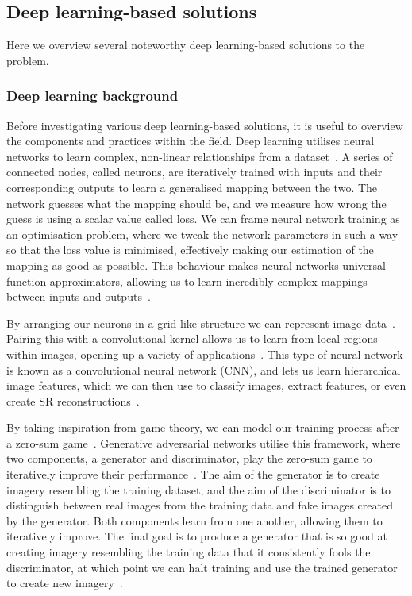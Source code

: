 \subsection{Deep learning-based solutions}
Here we overview several noteworthy deep learning-based solutions to the problem.

\subsubsection{Deep learning background}
Before investigating various deep learning-based solutions, it is useful to overview the components and practices within the field. Deep learning utilises neural networks to learn complex, non-linear relationships from a dataset~\cite{nn}. A series of connected nodes, called neurons, are iteratively trained with inputs and their corresponding outputs to learn a generalised mapping between the two. The network guesses what the mapping should be, and we measure how wrong the guess is using a scalar value called loss. We can frame neural network training as an optimisation problem, where we tweak the network parameters in such a way so that the loss value is minimised, effectively making our estimation of the mapping as good as possible. This behaviour makes neural networks universal function approximators, allowing us to learn incredibly complex mappings between inputs and outputs~\cite{nn}.

By arranging our neurons in a grid like structure we can represent image data~\cite{imageNet}. Pairing this with a convolutional kernel allows us to learn from local regions within images, opening up a variety of applications~\cite{imageNet}. This type of neural network is known as a convolutional neural network (CNN), and lets us learn hierarchical image features, which we can then use to classify images, extract features, or even create SR reconstructions~\cite{vgg19,imageNet,srcnn}.

By taking inspiration from game theory, we can model our training process after a zero-sum game~\cite{gan}. Generative adversarial networks utilise this framework, where two components, a generator and discriminator, play the zero-sum game to iteratively improve their performance~\cite{gan}. The aim of the generator is to create imagery resembling the training dataset, and the aim of the discriminator is to distinguish between real images from the training data and fake images created by the generator. Both components learn from one another, allowing them to iteratively improve. The final goal is to produce a generator that is so good at creating imagery resembling the training data that it consistently fools the discriminator, at which point we can halt training and use the trained generator to create new imagery~\cite{gan}.


